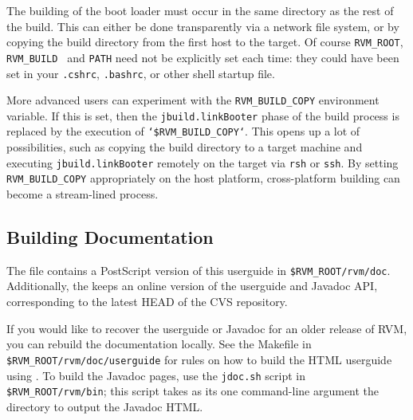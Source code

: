 The building of the boot loader must occur in the same directory as
the rest of the build.  This can either be done transparently via a
network file system, or by copying the build directory from the first
host to the target.  Of course {\tt RVM\_ROOT}, {\tt RVM\_BUILD }
and {\tt PATH} need not be explicitly set each time: they could have
been set in your {\tt .cshrc}, {\tt .bashrc}, or other shell startup file.

More advanced users can experiment with the {\tt RVM\_BUILD\_COPY}
environment variable.  If this is set, then the 
{\tt jbuild.linkBooter} phase of the build process is replaced by the
execution of {\tt `\$RVM\_BUILD\_COPY`}.  This opens up a lot of
possibilities, such as copying the build directory to a target
machine and executing {\tt jbuild.linkBooter} remotely on the target
via {\tt rsh} or {\tt ssh}.  By setting {\tt RVM\_BUILD\_COPY}
appropriately on the host platform, cross-platform building can become
a stream-lined process.

\JikesAIXTMFooter

\JavaTMFooter

\subsection{Building Documentation}

The {\tt \RVMTarFile} file contains a PostScript version of this userguide
in {\tt \$RVM\_ROOT/rvm/doc}.  Additionally, the 
 keeps an online version of
the userguide and Javadoc API, corresponding to the latest HEAD of the CVS
repository.

If you would like to recover the userguide or Javadoc for an older release
of RVM, you can rebuild the documentation locally.  See the Makefile in
{\tt \$RVM\_ROOT/rvm/doc/userguide} for rules on how to build the
HTML userguide using
.  To build the Javadoc pages, use
the {\tt jdoc.sh} script in {\tt \$RVM\_ROOT/rvm/bin}; this script takes as
its one command-line argument the directory to output the Javadoc HTML.
